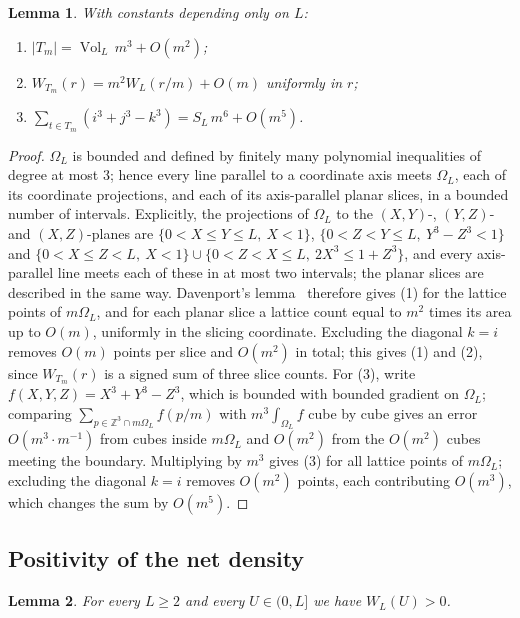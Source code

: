 \documentclass[11pt]{amsart}
\newtheorem{lemma}{Lemma}
\theoremstyle{remark}
\newcommand{\Z}{\mathbb{Z}}
\newcommand{\Vol}{\operatorname{Vol}}
\begin{document}
\begin{lemma}\label{lem:D}
With constants depending only on $L$:
\begin{enumerate}
\item $|T_m|=\Vol_L\,m^3+O(m^2)$;
\item $W_{T_m}(r)=m^2W_L(r/m)+O(m)$ uniformly in $r$;
\item $\sum_{t\in T_m}(i^3+j^3-k^3)=S_L\,m^6+O(m^5)$.
\end{enumerate}
\end{lemma}

\begin{proof}
$\Omega_L$ is bounded and defined by finitely many polynomial inequalities of degree at most $3$; hence every line parallel to a coordinate axis meets $\Omega_L$, each of its coordinate projections, and each of its axis-parallel planar slices, in a bounded number of intervals. Explicitly, the projections of $\Omega_L$ to the $(X,Y)$-, $(Y,Z)$- and $(X,Z)$-planes are $\{0<X\le Y\le L,\ X<1\}$, $\{0<Z<Y\le L,\ Y^3-Z^3<1\}$ and $\{0<X\le Z<L,\ X<1\}\cup\{0<Z<X\le L,\ 2X^3\le1+Z^3\}$, and every axis-parallel line meets each of these in at most two intervals; the planar slices are described in the same way. Davenport's lemma~\cite{Davenport} therefore gives (1) for the lattice points of $m\Omega_L$, and for each planar slice a lattice count equal to $m^2$ times its area up to $O(m)$, uniformly in the slicing coordinate. Excluding the diagonal $k=i$ removes $O(m)$ points per slice and $O(m^2)$ in total; this gives (1) and (2), since $W_{T_m}(r)$ is a signed sum of three slice counts. For (3), write $f(X,Y,Z)=X^3+Y^3-Z^3$, which is bounded with bounded gradient on $\Omega_L$; comparing $\sum_{p\in\Z^3\cap m\Omega_L}f(p/m)$ with $m^3\int_{\Omega_L}f$ cube by cube gives an error $O(m^3\cdot m^{-1})$ from cubes inside $m\Omega_L$ and $O(m^2)$ from the $O(m^2)$ cubes meeting the boundary. Multiplying by $m^3$ gives (3) for all lattice points of $m\Omega_L$; excluding the diagonal $k=i$ removes $O(m^2)$ points, each contributing $O(m^3)$, which changes the sum by $O(m^5)$.
\end{proof}

\subsection{Positivity of the net density}

\begin{lemma}\label{lem:W}
For every $L\ge2$ and every $U\in(0,L]$ we have $W_L(U)>0$.
\end{lemma}
\end{document}
